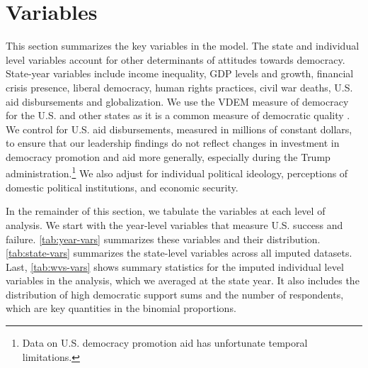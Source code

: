 \documentclass[12pt]{article}
\begin{document}
\section{Variables}


This section summarizes the key variables in the model. 
The state and individual level variables account for other determinants of attitudes towards democracy. 
State-year variables include income inequality, GDP levels and growth, financial crisis presence, liberal democracy, human rights practices, civil war deaths, U.S. aid disbursements and globalization. 
We use the VDEM measure of democracy for the U.S. and other states as it is a common measure of democratic quality \citep{WaldnerLust2018}.
We control for U.S. aid disbursements, measured in millions of constant dollars, to ensure that our leadership findings do not reflect changes in investment in democracy promotion and aid more generally, especially during the Trump administration.\footnote{Data on U.S. democracy promotion aid has unfortunate temporal limitations.} 
We also adjust for individual political ideology, perceptions of domestic political institutions, and economic security.


In the remainder of this section, we tabulate the variables at each level of analysis. 
We start with the year-level variables that measure U.S. success and failure. 
\autoref{tab:year-vars} summarizes these variables and their distribution. 
\autoref{tab:state-vars} summarizes the state-level variables across all imputed datasets.
Last, \autoref{tab:wvs-vars} shows summary statistics for the imputed individual level variables in the analysis, which we averaged at the state year. 
It also includes the distribution of high democratic support sums and the number of respondents, which are key quantities in the binomial proportions.
 
\end{document}
